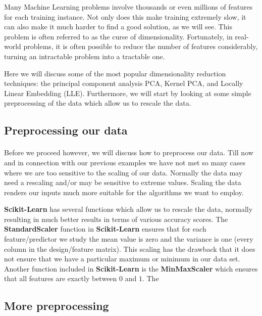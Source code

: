 \documentclass[%
oneside,                 %
final,                   %
10pt]{article}
\begin{document}
Many Machine Learning problems involve thousands or even millions of
features for each training instance. Not only does this make training
extremely slow, it can also make it much harder to find a good
solution, as we will see. This problem is often referred to as the
curse of dimensionality.  Fortunately, in real-world problems, it is
often possible to reduce the number of features considerably, turning
an intractable problem into a tractable one.

Here we will discuss some of the most popular dimensionality reduction
techniques: the principal component analysis PCA, Kernel PCA, and
Locally Linear Embedding (LLE).  Furthermore, we will start by looking
at some simple preprocessing of the data which allow us to rescale the
data.




\subsection*{Preprocessing our data}

\paragraph{}

Before we proceed however, we will discuss how to preprocess our
data. Till now and in connection with our previous examples we have
not met so many cases where we are too sensitive to the scaling of our
data. Normally the data may need a rescaling and/or may be sensitive
to extreme values. Scaling the data renders our inputs much more
suitable for the algorithms we want to employ.

\textbf{Scikit-Learn} has several functions which allow us to rescale the
data, normally resulting in much better results in terms of various
accuracy scores.  The \textbf{StandardScaler} function in \textbf{Scikit-Learn}
ensures that for each feature/predictor we study the mean value is
zero and the variance is one (every column in the design/feature
matrix).  This scaling has the drawback that it does not ensure that
we have a particular maximum or minimum in our data set. Another
function included in \textbf{Scikit-Learn} is the \textbf{MinMaxScaler} which
ensures that all features are exactly between $0$ and $1$. The

\subsection*{More preprocessing}
\end{document}
